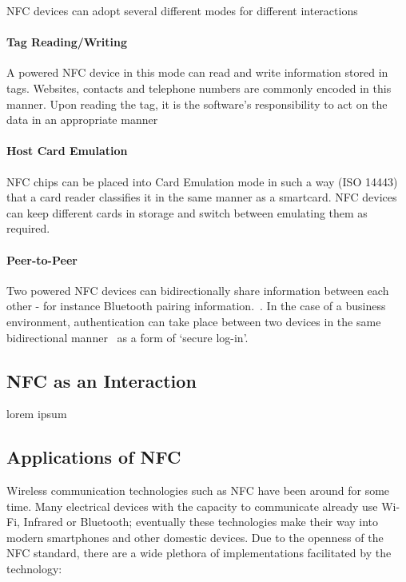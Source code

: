 NFC devices can adopt several different modes for different interactions~\cite{4278549}

\paragraph{Tag Reading/Writing}
A powered NFC device in this mode can read and write information stored in tags. Websites,  contacts and telephone numbers are commonly encoded in this manner. Upon reading the tag, it is the software's responsibility to act on the data in an appropriate manner~\cite{ecosystem}

\paragraph{Host Card Emulation}
NFC chips can be placed into Card Emulation mode in such a way (ISO 14443)~\cite{iso14443} that a card reader classifies it in the same manner as a smartcard. NFC devices can keep different cards in storage and switch between emulating them as required.~\cite{ecosystem}

\paragraph{Peer-to-Peer}
Two powered NFC devices can bidirectionally share information between each other - for instance Bluetooth pairing information.~\cite{ecosystem}. In the case of a business environment, authentication can take place between two devices in the same bidirectional manner~\cite{iso18092} as a form of `secure log-in'.

\subsection{NFC as an Interaction}
lorem ipsum
\clearpage{}
\subsection{Applications of NFC}
Wireless communication technologies such as NFC have been around for some time. Many electrical devices with the capacity to communicate already use Wi-Fi, Infrared or Bluetooth; eventually these technologies make their way into modern smartphones and other domestic devices. Due to the openness of the NFC standard, there are a wide plethora of implementations facilitated by the technology:

